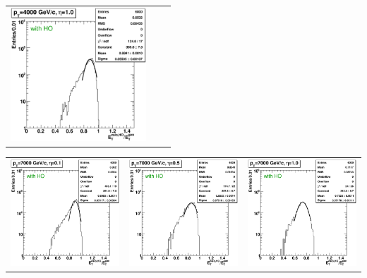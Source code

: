 \documentclass{cmspaper}
\begin{document}
\begin{appendices}
\begin{center}
\begin{tabular}{lll}
 \includegraphics[width=2in]{figs/h_ETRatioWithHO_ET_py_fit_corr_eta1.0_pT4000.eps} \\
\end{tabular}
\end{center}
\begin{center}
\begin{tabular}{lll}
 \includegraphics[width=2in]{figs/h_ETRatioWithHO_ET_py_fit_corr_eta0.1_pT7000.eps} &
 \includegraphics[width=2in]{figs/h_ETRatioWithHO_ET_py_fit_corr_eta0.5_pT7000.eps} &
 \includegraphics[width=2in]{figs/h_ETRatioWithHO_ET_py_fit_corr_eta1.0_pT7000.eps} \\
\end{tabular}
\end{center}



\end{appendices}
\end{document}
